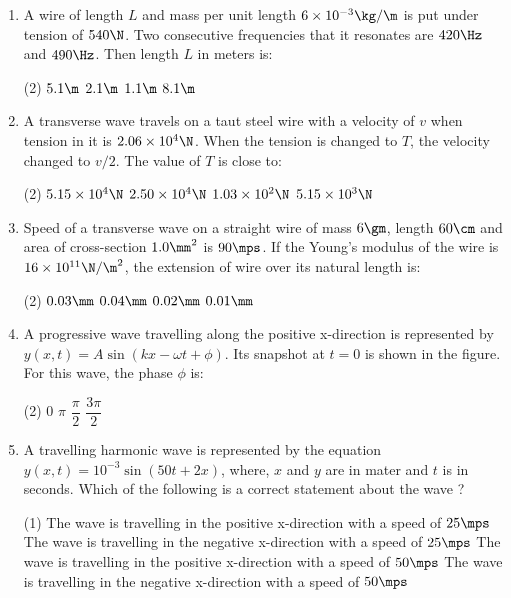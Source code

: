 \documentclass{article}
\renewcommand{\ans}{\quad}
\begin{document}
\begin{enumerate}
\item A wire of length $L$ and mass per unit length $6\times 10^{-3}\kg/\m$ is put under tension of $540\N$. Two consecutive frequencies that it resonates are $420\Hz$ and $490\Hz$. Then length $L$ in meters is:
	\begin{tasks}(2)
		\task $5.1\m$
		\task $2.1\m$\ans
		\task $1.1\m$
		\task $8.1\m$
	\end{tasks} 

\item A transverse wave travels on a taut steel wire with a velocity of $v$ when tension in it is $2.06\times 10^4 \N$. When the tension is changed to $T$, the velocity changed to $v/2$. The value of $T$ is close to:
	\begin{tasks}(2)
		\task $5.15\times 10^4 \N$
		\task $2.50\times 10^4 \N$
		\task $1.03\times 10^2 \N$
		\task $5.15\times 10^3 \N$\ans
	\end{tasks}

\item Speed of a transverse wave on a straight wire of mass $6\gm$, length $60\cm$ and area of cross-section $1.0\mm^2$ is $90\mps$. If the Young's modulus of the wire is $16\times 10^{11}\N/\m^2$, the extension of wire over its natural length is:
	\begin{tasks}(2)
		\task $0.03\mm$\ans
		\task $0.04\mm$
		\task $0.02\mm$
		\task $0.01\mm$
	\end{tasks}

\item A progressive wave travelling along the positive x-direction is represented by $y(x, t)=A\sin\left(kx-\omega t + \phi\right)$. Its snapshot at $t=0$ is shown in the figure. For this wave, the phase $\phi$ is:
	\begin{center}
	\end{center}
	\begin{tasks}(2)
		\task $0$
		\task $\pi$\ans
		\task $\dfrac{\pi}{2}$
		\task $\dfrac{3\pi}{2}$
	\end{tasks}

\item A travelling harmonic wave is represented by the equation $y(x,t) = 10^{-3}\sin (50t + 2x)$, where, $x$ and $y$ are in mater and $t$ is in seconds. Which of the following is a correct statement about the wave ? 
	\begin{tasks}(1)
		\task The wave is travelling in the positive x-direction with a speed of $25\mps$
		\task The wave is travelling in the negative x-direction with a speed of $25\mps$\ans
		\task The wave is travelling in the positive x-direction with a speed of $50\mps$
		\task The wave is travelling in the negative x-direction with a speed of $50\mps$
	\end{tasks}


\end{enumerate}
\end{document}
